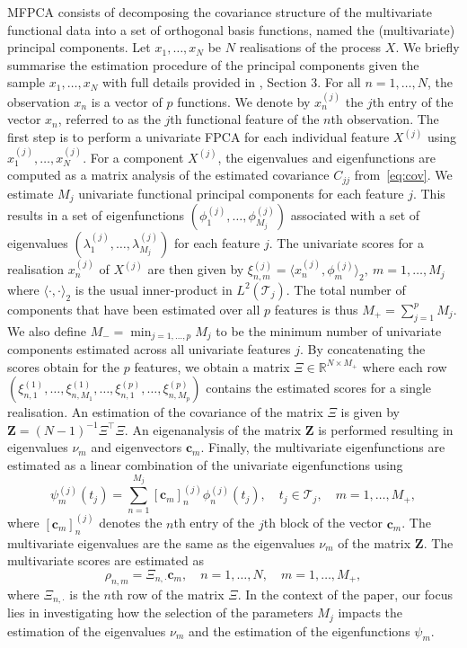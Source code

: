 \documentclass{article}
\newcounter{th}
\newcommand{\RR}{\mathbb{R}} %
\begin{document}
MFPCA consists of decomposing the covariance structure of the multivariate functional data into a set of orthogonal basis functions, named the (multivariate) principal components. Let $x_1, \dots, x_N$ be $N$ realisations of the process $X$. We briefly summarise the estimation procedure of the principal components given the sample $x_1, \dots, x_N$ with full details provided in \cite{happMultivariateFunctionalPrincipal2018}, Section 3. For all $n = 1, \dots, N$, the observation $x_n$ is a vector of $p$ functions. We denote by $x_n^{(j)}$ the $j$th entry of the vector $x_n$, referred to as the $j$th functional feature of the $n$th observation. The first step is to perform a univariate FPCA for each individual feature $X^{(j)}$ using $x_1^{(j)}, \dots, x_N^{(j)}$. For a component $X^{(j)}$, the eigenvalues and eigenfunctions are computed as a matrix analysis of the estimated covariance $C_{jj}$ from~\eqref{eq:cov}. We estimate $M_j$ univariate functional principal components for each feature $j$. This results in a set of eigenfunctions $(\phi^{(j)}_{1}, \ldots, \phi^{(j)}_{M_j})$ associated with a set of eigenvalues $(\lambda^{(j)}_1, \ldots, \lambda^{(j)}_{M_j})$ for each feature $j$. The univariate scores for a realisation $x^{(j)}_n$ of $X^{(j)}$ are then given by $\xi^{(j)}_{n, m} = \langle  x^{(j)}_n, \phi^{(j)}_m \rangle_2,~m = 1, \ldots, M_j$ where $\langle \cdot, \cdot\rangle_2$ is the usual inner-product in $L^2(\mathcal{T}_j)$. The total number of components that have been estimated over all $p$ features is thus $M_+ = \sum_{j = 1}^p M_j$. We also define $M_{-} = \min_{j = 1, \dots, p} M_j$ to be the minimum number of univariate components estimated across all univariate features $j$. By concatenating the scores obtain for the $p$ features, we obtain a matrix $\Xi \in \RR^{N \times M_+}$ where each row $(\xi^{(1)}_{n, 1}, \ldots, \xi^{(1)}_{n, M_1}, \ldots, \xi^{(p)}_{n, 1}, \ldots, \xi^{(p)}_{n, M_p})$ contains the estimated scores for a single realisation. An estimation of the covariance of the matrix $\Xi$ is given by $\mathbf{Z} = (N - 1)^{-1}\Xi^\top\Xi$. An eigenanalysis of the matrix $\mathbf{Z}$ is performed resulting in eigenvalues $\nu_m$ and eigenvectors $\mathbf{c}_m$. Finally, the multivariate eigenfunctions are estimated as a linear combination of the univariate eigenfunctions using
\begin{equation}
    \psi^{(j)}_m(t_j) = \sum_{n = 1}^{M_j}[\mathbf{c}_m]^{(j)}_n \phi^{(j)}_{n}(t_j), \quad t_j \in \mathcal{T}_j, \quad m = 1, \dots, M_+,
\end{equation}
where $[\mathbf{c}_m]^{(j)}_n$ denotes the $n$th entry of the $j$th block of the vector $\mathbf{c}_m$. The multivariate eigenvalues are the same as the eigenvalues $\nu_m$ of the matrix $\mathbf{Z}$. The multivariate scores are estimated as
\begin{equation}
    \rho_{n,m} = \Xi_{n, \cdot}\mathbf{c}_m, \quad n = 1, \ldots, N, \quad m = 1, \ldots, M_+,
\end{equation}
where $\Xi_{n, \cdot}$ is the $n$th row of the matrix $\Xi$. In the context of the paper, our focus lies in investigating how the selection of the parameters $M_j$ impacts the estimation of the eigenvalues $\nu_m$ and the estimation of the eigenfunctions $\psi_m$.
\end{document}
